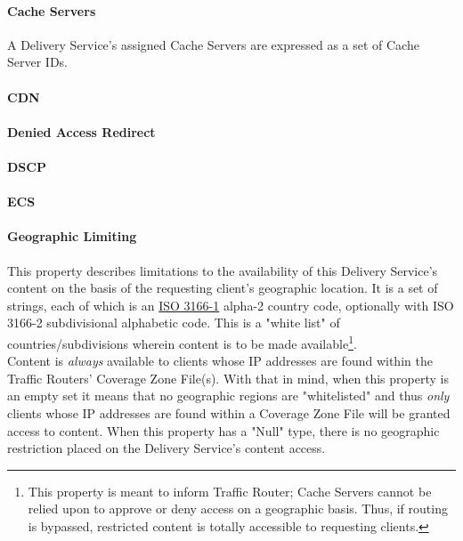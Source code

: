 \paragraph{Cache Servers}
A Delivery Service's assigned Cache Servers are expressed as a set of Cache Server
IDs.

\paragraph{CDN}


\paragraph{Denied Access Redirect}

\paragraph{DSCP}

\paragraph{ECS}

\paragraph{Geographic Limiting}
This property describes limitations to the availability of this Delivery Service's
content on the basis of the requesting client's geographic location. It is a set of
strings, each of which is an \href{https://www.iso.org/obp/ui/#search/code/}{ISO 3166-1}
alpha-2 country code, optionally with ISO 3166-2 subdivisional alphabetic code. This is
a "white list" of countries/subdivisions wherein content is to be made available\footnote{
This property is meant to inform Traffic Router; Cache Servers cannot be relied upon to
approve or deny access on a geographic basis. Thus, if routing is bypassed, restricted
content is totally accessible to requesting clients.}.\\
Content is \emph{always} available to clients whose IP addresses are found within the
Traffic Routers' Coverage Zone File(s). With that in mind, when this property is an empty
set it means that no geographic regions are "whitelisted" and thus \emph{only} clients
whose IP addresses are found within a Coverage Zone File will be granted access to content.
When this property has a "Null" type, there is no geographic restriction placed on the
Delivery Service's content access.

